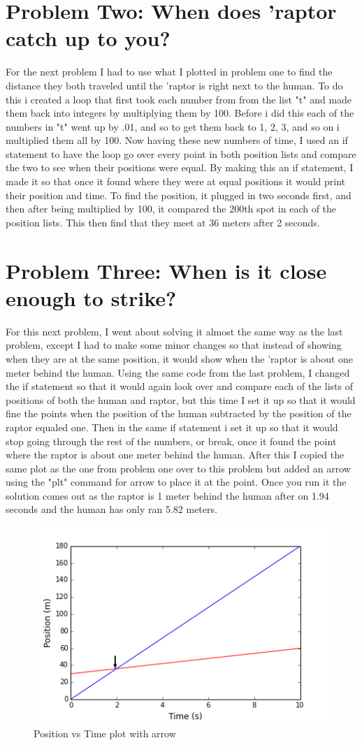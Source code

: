 \documentclass[twocolumn]{revtex4}
\begin{document}
\section{Problem Two: When does 'raptor catch up to you?}
 	For the next problem I had to use what I plotted in problem one to find the distance they both traveled until the 'raptor is right next to the human. To do this i created a loop that first took each number from from the list "t" and made them back into integers by multiplying them by 100. Before i did this each of the numbers in "t" went up by .01, and so to get them back to 1, 2, 3, and so on i multiplied them all by 100. Now having these new numbers of time, I used an if statement to have the loop go over every point in both position lists and compare the two to see when their positions were equal. By making this an if statement, I made it so that once it found where they were at equal positions it would print their position and time. To find the position, it plugged in two seconds first, and then after being multiplied by 100, it compared the 200th spot in each of the position lists. This then find that they meet at 36 meters after 2 seconds.

\section{Problem Three: When is it close enough to strike?}
	For this next problem, I went about solving it almost the same way as the last problem, except I had to make some minor changes so that instead of showing when they are at the same position, it would show when the 'raptor is about one meter behind the human. Using the same code from the last problem, I changed the if statement so that it would again look over and compare each of the lists of positions of both the human and raptor, but this time I set it up so that it would fine the points when the position of the human subtracted by the position of the raptor equaled one. Then in the same if statement i set it up so that it would stop going through the rest of the numbers, or break, once it found the point where the raptor is about one meter behind the human. After this I copied the same plot as the one from problem one over to this problem but added an arrow using the "plt" command for arrow to place it at the point. Once you run it the solution comes out as the raptor is 1 meter behind the human after on 1.94 seconds and the human has only ran 5.82 meters.
\begin{figure}[h]
	\centering
	\includegraphics[width=.5\textwidth]{RaptorvHuman_Finnegan_arrow.png}
	\caption{Position vs Time plot with arrow \label{fig: Position vs Time plot}}
\end{figure}
\end{document}
